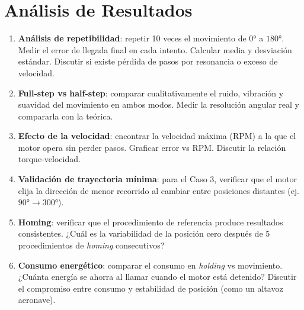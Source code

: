 \documentclass[11pt]{article}
\begin{document}
\section{Análisis de Resultados}
\begin{enumerate}
  \item \textbf{Análisis de repetibilidad}: repetir 10 veces el movimiento de
        $0\si{\degree}$ a $180\si{\degree}$. Medir el error de llegada final en cada
        intento. Calcular media y desviación estándar. Discutir si existe pérdida de
        pasos por resonancia o exceso de velocidad.
  \item \textbf{Full-step vs half-step}: comparar cualitativamente el ruido, vibración y
        suavidad del movimiento en ambos modos. Medir la resolución angular real y
        compararla con la teórica.
  \item \textbf{Efecto de la velocidad}: encontrar la velocidad máxima (RPM) a la que el
        motor opera sin perder pasos. Graficar error vs RPM. Discutir la relación
        torque-velocidad.
  \item \textbf{Validación de trayectoria mínima}: para el Caso 3, verificar que el motor
        elija la dirección de menor recorrido al cambiar entre posiciones distantes (ej.
        $90\si{\degree}\to 300\si{\degree}$).
  \item \textbf{Homing}: verificar que el procedimiento de referencia produce resultados
        consistentes. ¿Cuál es la variabilidad de la posición cero después de 5
        procedimientos de \emph{homing} consecutivos?
  \item \textbf{Consumo energético}: comparar el consumo en \emph{holding} vs
        movimiento. ¿Cuánta energía se ahorra al llamar  cuando el motor
        está detenido? Discutir el compromiso entre consumo y estabilidad de posición
        (como un altavoz aeronave).
\end{enumerate}

\end{document}

